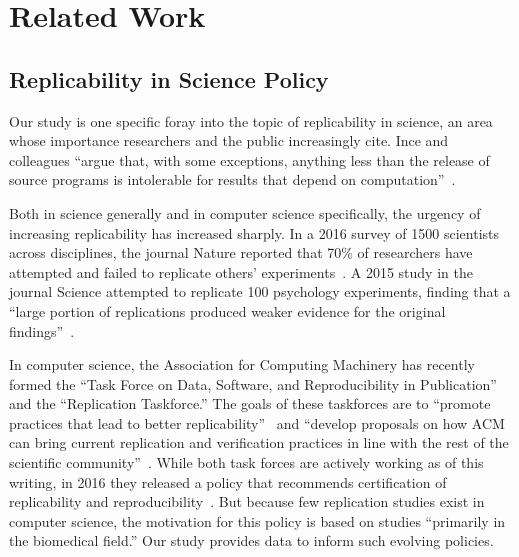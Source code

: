 \documentclass[10pt,conference]{IEEEtran}
\begin{document}
\section{Related Work}


\subsection{Replicability in Science Policy}


Our study is one specific foray into the topic of replicability
in science, an area whose importance researchers and the public 
increasingly cite.
Ince and colleagues ``argue that, with some exceptions, anything less 
than the release of source programs is intolerable for 
results that depend on computation''~\cite{ince2012case}.

Both in science generally and in computer science specifically,
the urgency of increasing replicability has increased sharply.
In a 2016 survey of 1500 scientists across disciplines, the journal
Nature reported that 70\% of researchers have attempted
and failed to replicate others' experiments~\cite{baker20161}.
A 2015 study in the journal Science 
attempted to replicate 100 psychology experiments,
finding that a ``large portion of replications produced weaker evidence for the original findings''~\cite{open2015estimating}.

In computer science, the Association for Computing Machinery has
recently formed the ``Task Force on Data, Software, and Reproducibility in Publication''
and the ``Replication Taskforce.''
The goals of these taskforces are to 
``promote practices that lead to better replicability''~\cite{acmDataTaskforce} and 
``develop proposals on how ACM can bring current replication and 
verification practices in line with the rest of the scientific 
community''~\cite{acmRepTaskforce}.
While both task forces are actively working as of this writing, 
in 2016 they released a policy that recommends certification of
replicability and reproducibility~\cite{acmArtifactPolicy}.
But because few replication studies exist in computer science,
the motivation for this policy is based on studies
``primarily in the biomedical field.''
Our study provides data to inform such evolving policies.
\end{document}
